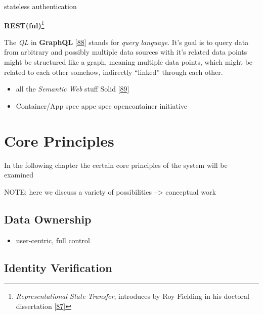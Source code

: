 \documentclass[12pt,english,a4paper,titlepage,cleardoublepage=empty,dottedtoc]{report}
\providecommand{\tightlist}{%
  \setlength{\itemsep}{0pt}\setlength{\parskip}{0pt}}
\begin{document}
stateless authentication

\textbf{REST(ful)}\footnote{\emph{Representational State Transfer},
  introduces by Roy Fielding in his doctoral dissertation
  {[}\protect\hyperlink{ref-web_spec_rest}{87}{]}}

The \emph{QL} in \textbf{GraphQL}
{[}\protect\hyperlink{ref-web_spec_graphql}{88}{]} stands for
\emph{query language}. It's goal is to query data from arbitrary and
possibly multiple data sources with it's related data points might be
structured like a graph, meaning multiple data points, which might be
related to each other somehow, indirectly ``linked'' through each other.

\begin{itemize}
\item
  all the \emph{Semantic Web} stuff Solid
  {[}\protect\hyperlink{ref-web_spec_solid}{89}{]}
\item
  Container/App spec appc spec opencontainer initiative
\end{itemize}

\chapter{Core Principles}\label{core-principles}

In the following chapter the certain core principles of the system will
be examined

NOTE: here we discuss a variety of possibilities --\textgreater{}
conceptual work

\section{Data Ownership}\label{data-ownership}

\begin{itemize}
\tightlist
\item
  user-centric, full control
\end{itemize}

\section{Identity Verification}\label{identity-verification}
\end{document}
